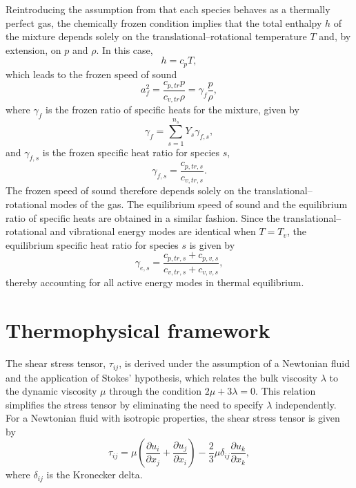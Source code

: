 Reintroducing the assumption from  that each species behaves as a thermally perfect gas, the chemically frozen condition implies that the total enthalpy $h$ of the mixture depends solely on the translational--rotational temperature $T$ and, by extension, on $p$ and $\rho$. In this case,
\begin{equation}
    h = c_p T,
\end{equation}
which leads to the frozen speed of sound
\begin{equation}
    a^{2}_{f} = \frac{c_{p,tr} p}{c_{v,tr} \rho} = \gamma_{f} \frac{p}{\rho},
\end{equation}
where $\gamma_{f}$ is the frozen ratio of specific heats for the mixture, given by
\begin{equation}
    \gamma_{f} = \sum_{s=1}^{n_s} Y_s \gamma_{f,s},
\end{equation}
and $\gamma_{f,s}$ is the frozen specific heat ratio for species $s$,
\begin{equation}\label{equation:frozengamma}
    \gamma_{f,s} = \frac{c_{p,tr,s}}{c_{v,tr,s}}.
\end{equation}
The frozen speed of sound therefore depends solely on the translational--rotational modes of the gas. The equilibrium speed of sound and the equilibrium ratio of specific heats are obtained in a similar fashion. Since the translational--rotational and vibrational energy modes are identical when $T = T_v$, the equilibrium specific heat ratio for species $s$ is given by
\begin{equation}\label{equation:equilibriumgamma}
    \gamma_{e,s} = \frac{c_{p,tr,s} + c_{p,v,s}}{c_{v,tr,s} + c_{v,v,s}},
\end{equation}
thereby accounting for all active energy modes in thermal equilibrium.

\section{Thermophysical framework}
The shear stress tensor, $\tau_{ij}$, is derived under the assumption of a Newtonian fluid and the application of Stokes' hypothesis, which relates the bulk viscosity $\lambda$ to the dynamic viscosity $\mu$ through the condition $2\mu + 3\lambda = 0$. This relation simplifies the stress tensor by eliminating the need to specify $\lambda$ independently. For a Newtonian fluid with isotropic properties, the shear stress tensor is given by
\begin{equation}
    \tau_{ij} = \mu \left(\frac{\partial u_i}{\partial x_j} + \frac{\partial u_j}{\partial x_i}\right)
    - \frac{2}{3} \mu \delta_{ij} \frac{\partial u_k}{\partial x_k},
\end{equation}
where $\delta_{ij}$ is the Kronecker delta.


